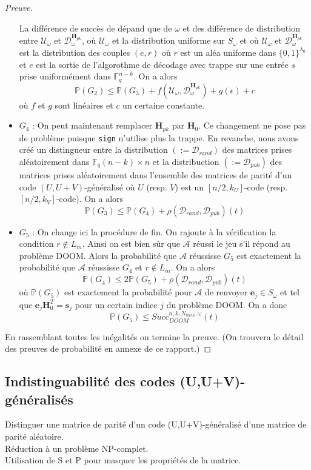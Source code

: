 \documentclass[12pt]{article}
\theoremstyle{plain}
\newcommand{\F}{\mathbb{F}}
\newcommand{\A}{\mathcal{A}}
\newcommand{\e}{\mathbf{e}}
\newcommand{\s}{\mathbf{s}}
\begin{document}
\begin{proof}[Preuve]
\begin{itemize}
 La différence de succès de dépand que de $\omega$ et des différence de distribution entre $\mathcal{U}_{\omega}$ et $\mathcal{D}_{\omega}^{\mathbf{H}_{pk}}$, où $\mathcal{U}_{\omega}$ et la distribution uniforme sur $S_{\omega}$ et où $\mathcal{U}_{\omega}$ et $\mathcal{D}_{\omega}^{\mathbf{H}_{pk}}$ est la distribution des couples $(e,r)$ où $r$ est un aléa uniforme dans $\{0,1\}^{\lambda_0}$ et $e$ est la sortie de l'algorothme de décodage avec trappe sur une entrée $s$ prise uniformément dans $\F_q^{n-k}$.
On a alors 
$$ \mathbb{P}(G_2) \leq  \mathbb{P}(G_3) + f(\mathcal{U}_{\omega},\mathcal{D}_{\omega}^{\mathbf{H}_{pk}}) + g(\epsilon) + c$$
où $f$ et $g$ sont linéaires et $c$ un certaine constante.
\item $G_4$ : On peut maintenant remplacer $\mathbf{H}_{pk}$ par $\mathbf{H}_0$. Ce changement ne pose pas de problème puisque \verb|sign| n'utilise plus la trappe. En revanche, nous avons créé un distingueur entre la distribution $(:=\mathcal{D}_{rand})$ des matrices prises aléatoirement dans $\F_q{(n-k)\times n}$ et la distribuction $(:=\mathcal{D}_{pub})$ des matrices prises aléatoirement dans l'ensemble des matrices de parité d'un code $(U,U+V)$-généralisé où $U$ (resp. $V$) est un $[n/2,k_U]$-code (resp. $[n/2,k_V]$-code). 
On a alors 
$$ \mathbb{P}(G_3) \leq  \mathbb{P}(G_4) + \rho(\mathcal{D}_{rand},\mathcal{D}_{pub})(t)$$
\item $G_5$ : On change ici la procédure de fin. On rajoute à la vérification la condition $r \notin L_m$. Ainsi on est bien sûr que $\A$ réussi le jeu s'il répond au problème DOOM. Alors la probabilité que $\A$ réussisse $G_5$ est exactement la probabilité que $\A$ réussisse $G_4$ et $r\notin L_m$.
On a alors 
$$ \mathbb{P}(G_4) \leq  2\mathbb{P}(G_5) + \rho(\mathcal{D}_{rand},\mathcal{D}_{pub})(t)$$
où $\mathbb{P}(G_5)$ est exactement la probabilité pour $\A$ de renvoyer $\e_j \in S_{\omega}$ et tel que $\e_j\mathbf{H}_0^T = \s_j$ pour un certain indice $j$ du problème DOOM. On a donc 
$$ \mathbb{P}(G_5) \leq Succ^{n,k,N_{hash}, \omega}_{DOOM}(t)$$
\end{itemize}
En rassemblant toutes les inégalités on termine la preuve. (On trouvera le détail des preuves de probabilité en annexe de ce rapport.)
\end{proof}


\subsection{Indistinguabilité des codes (U,U+V)-généralisés}
Distinguer une matrice de parité d'un code (U,U+V)-généralisé d'une matrice de parité aléatoire. \\
Réduction à un problème NP-complet. \\
Utilisation de S et P pour masquer les propriétés de la matrice. \\
\end{document}
